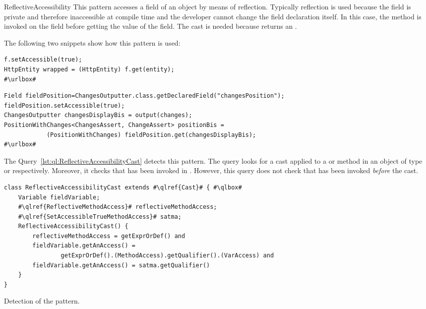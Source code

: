 \begin{pattern}{ReflectiveAccessibility}
This pattern accesses a field of an object by means of reflection.
Typically reflection is used because the field is private and therefore
inaccessible at compile time and the developer cannot change the field
declaration itself.
In this case, the method  is invoked on the field
before getting the value of the field.
The cast is needed because  returns an .

\instances{}
The following two snippets show how this pattern is used:

\def\urlvar{http://bit.ly/loopj_android_async_http_2SOISRr}
\begin{verbatim}
f.setAccessible(true);
HttpEntity wrapped = (HttpEntity) f.get(entity);
#\urlbox#
\end{verbatim}

\def\urlvar{http://bit.ly/joel_costigliola_assertj_db_2Ip1Rho}
\begin{verbatim}
Field fieldPosition=ChangesOutputter.class.getDeclaredField("changesPosition");
fieldPosition.setAccessible(true);
ChangesOutputter changesDisplayBis = output(changes);
PositionWithChanges<ChangesAssert, ChangeAssert> positionBis = 
            (PositionWithChanges) fieldPosition.get(changesDisplayBis);
#\urlbox#
\end{verbatim}


\detection{}
The Query~\ref{lst:ql:ReflectiveAccessibilityCast} detects this pattern.
The query looks for a cast applied to a  or  method in an object  of type  or  respectively.
Moreover, it checks that  has been invoked in .
However, this query does not check that  has been invoked \emph{before} the cast.

\begin{listing}
\begin{verbatim}
class ReflectiveAccessibilityCast extends #\qlref{Cast}# { #\qlbox#
	Variable fieldVariable;
    #\qlref{ReflectiveMethodAccess}# reflectiveMethodAccess;
	#\qlref{SetAccessibleTrueMethodAccess}# satma;
	ReflectiveAccessibilityCast() {
		reflectiveMethodAccess = getExprOrDef() and
		fieldVariable.getAnAccess() = 
                getExprOrDef().(MethodAccess).getQualifier().(VarAccess) and
		fieldVariable.getAnAccess() = satma.getQualifier()
	}
}
\end{verbatim}
\caption{Detection of the \thisp{} pattern.}
\label{lst:ql:ReflectiveAccessibilityCast}
\end{listing}



\end{pattern}
